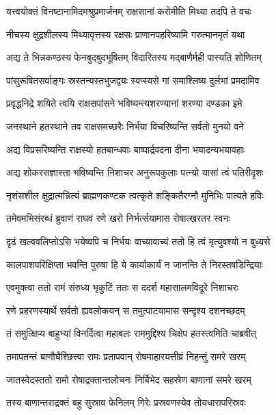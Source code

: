 \twolineshloka
{यत्त्वयोक्तं विनष्टानामिदमश्रुप्रमार्जनम्}
{राक्षसानां करोमीति मिथ्या तदपि ते वचः} %

\twolineshloka
{नीचस्य क्षुद्रशीलस्य मिथ्यावृत्तस्य रक्षसः}
{प्राणानपहरिष्यामि गरुत्मानमृतं यथा} %

\twolineshloka
{अद्य ते भिन्नकण्ठस्य फेनबुद्बुदभूषितम्}
{विदारितस्य मद्बाणैर्मही पास्यति शोणितम्} %

\twolineshloka
{पांसुरूषितसर्वाङ्गः स्रस्तन्यस्तभुजद्वयः}
{स्वप्स्यसे गां समाश्लिष्य दुर्लभां प्रमदामिव} %

\twolineshloka
{प्रवृद्धनिद्रे शयिते त्वयि राक्षसपांसने}
{भविष्यन्त्यशरण्यानां शरण्या दण्डका इमे} %

\twolineshloka
{जनस्थाने हतस्थाने तव राक्षसमच्छरैः}
{निर्भया विचरिष्यन्ति सर्वतो मुनयो वने} %

\twolineshloka
{अद्य विप्रसरिष्यन्ति राक्षस्यो हतबान्धवाः}
{बाष्पार्द्रवदना दीना भयादन्यभयावहाः} %

\twolineshloka
{अद्य शोकरसज्ञास्ता भविष्यन्ति निशाचर}
{अनुरूपकुलाः पत्न्यो यासां त्वं पतिरीदृशः} %

\twolineshloka
{नृशंसशील क्षुद्रात्मन्नित्यं ब्राह्मणकण्टक}
{त्वत्कृते शङ्कितैरग्नौ मुनिभिः पात्यते हविः} %

\twolineshloka
{तमेवमभिसंरब्धं ब्रुवाणं राघवं रणे}
{खरो निर्भर्त्सयामास रोषात्खरतर स्वनः} %

\twolineshloka
{दृढं खल्ववलिप्तोऽसि भयेष्वपि च निर्भयः}
{वाच्यावाच्यं ततो हि त्वं मृत्युवश्यो न बुध्यसे} %

\twolineshloka
{कालपाशपरिक्षिप्ता भवन्ति पुरुषा हि ये}
{कार्याकार्यं न जानन्ति ते निरस्तषडिन्द्रियाः} %

\twolineshloka
{एवमुक्त्वा ततो रामं संरुध्य भृकुटिं ततः}
{स ददर्श महासालमविदूरे निशाचरः} %

\twolineshloka
{रणे प्रहरणस्यार्थे सर्वतो ह्यवलोकयन्}
{स तमुत्पाटयामास सन्दृश्य दशनच्छदम्} %

\twolineshloka
{तं समुत्क्षिप्य बाहुभ्यां विनर्दित्वा महाबलः}
{राममुद्दिश्य चिक्षेप हतस्त्वमिति चाब्रवीत्} %

\twolineshloka
{तमापतन्तं बाणौघैश्छित्त्वा रामः प्रतापवान्}
{रोषमाहारयत्तीव्रं निहन्तुं समरे खरम्} %

\twolineshloka
{जातस्वेदस्ततो रामो रोषाद्रक्तान्तलोचनः}
{निर्बिभेद सहस्रेण बाणानां समरे खरम्} %

\twolineshloka
{तस्य बाणान्तराद्रक्तं बहु सुस्राव फेनिलम्}
{गिरेः प्रस्रवणस्येव तोयधारापरिस्रवः} %

